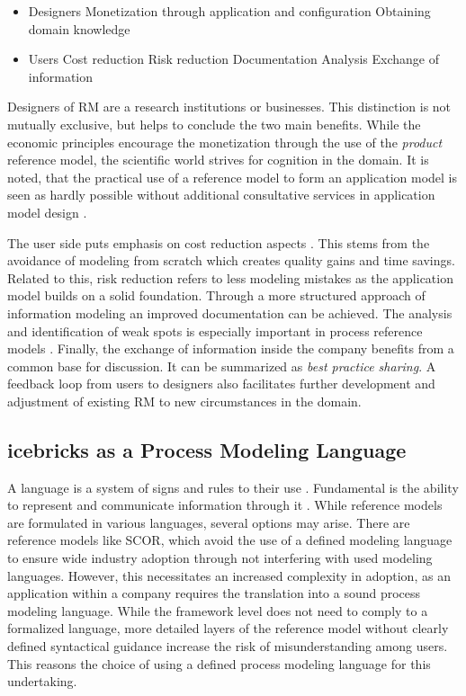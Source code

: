 		\begin{itemize}
			\item Designers
			\subitem Monetization through application and configuration
			\subitem Obtaining domain knowledge
			\item Users
			\subitem Cost reduction
			\subitem Risk reduction
			\subitem Documentation
			\subitem Analysis
			\subitem Exchange of information  
		\end{itemize} 
	
		Designers of \acrshort{RM} are a research institutions or businesses. This distinction is not mutually exclusive,  but helps to conclude the two main benefits. While the economic principles encourage the monetization through the use of the \textit{product} reference model, the scientific world strives for cognition in the domain. It is noted, that the practical use of a reference model to form an application model is seen as hardly possible without additional consultative services in application model design \citep{Schutte1998}.
	
		The user side puts emphasis on cost reduction aspects \citep[]{Schutte1998}. This stems from the avoidance of modeling from scratch which creates quality gains and time savings. Related to this, risk reduction refers to less modeling mistakes as the application model builds on a solid foundation. Through a more structured approach of information modeling an improved documentation can be achieved. The analysis and identification of weak spots is especially important in process reference models \citep[]{becker2004handelsinformationssysteme}. Finally, the exchange of information inside the company benefits from a common base for discussion. It can be summarized as \textit{best practice sharing}. A feedback loop from users to designers also facilitates further development and adjustment of existing \acrshort{RM} to new circumstances in the domain. 
		
		\subsection{icebricks as a Process Modeling Language}
		
	 A language is a system of signs and rules to their use \citep[]{holten1999}. Fundamental is the ability to represent and communicate information through it \citep[]{brocke2003referenzmodellierung}. While reference models are formulated in various languages, several options may arise. There are reference models like \acrshort{SCOR}, which avoid the use of a defined modeling language to ensure wide industry adoption through not interfering with used modeling languages. However, this necessitates an increased complexity in adoption, as an application within a company requires the translation into a sound process modeling language. While the framework level does not need to comply to a formalized language, more detailed layers of the reference model without clearly defined syntactical guidance increase the risk of misunderstanding among users.
	 This reasons the choice of using a defined process modeling language for this undertaking.
	 
